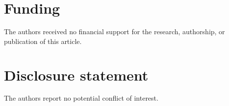 \section*{Funding}

The authors received no financial support for the research, authorship, or
publication of this article.

\section*{Disclosure statement}

The authors report no potential conflict of interest.
